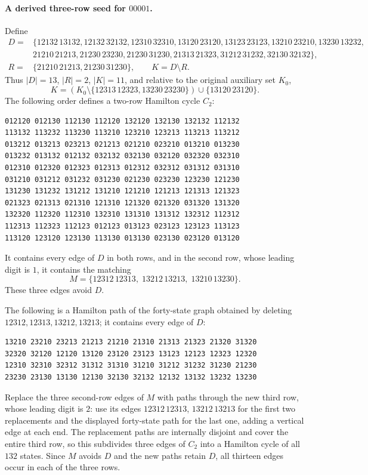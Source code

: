 \paragraph{A derived three-row seed for $00001$.}
Define
\[
\begin{split}
D={}&\{12132\,13132,12132\,32132,12310\,32310,
13120\,23120,13123\,23123,13210\,23210,13230\,13232,\\
&21210\,21213,21230\,23230,21230\,31230,
21313\,21323,31212\,31232,32130\,32132\},\\
R={}&\{21210\,21213,21230\,31230\},\qquad K=D\setminus R.
\end{split}
\]
Thus $|D|=13$, $|R|=2$, $|K|=11$, and relative to the original
auxiliary set $K_0$,
\[
K=(K_0\setminus\{12313\,12323,13230\,23230\})
   \cup\{13120\,23120\}.
\]
The following order defines a two-row Hamilton cycle $C_2$:
\begin{verbatim}
012120 012130 112130 112120 132120 132130 132132 112132
113132 113232 113230 113210 123210 123213 113213 113212
013212 013213 023213 021213 021210 023210 013210 013230
013232 013132 012132 032132 032130 032120 032320 032310
012310 012320 012323 012313 012312 032312 031312 031310
031210 031212 031232 031230 021230 023230 123230 121230
131230 131232 131212 131210 121210 121213 121313 121323
021323 021313 021310 121310 121320 021320 031320 131320
132320 112320 112310 132310 131310 131312 132312 112312
112313 112323 112123 012123 013123 023123 123123 113123
113120 123120 123130 113130 013130 023130 023120 013120
\end{verbatim}
It contains every edge of $D$ in both rows, and in the second row,
whose leading digit is $1$, it contains the matching
\[
M=\{12312\,12313,\;13212\,13213,\;13210\,13230\}.
\]
These three edges avoid $D$.

The following is a Hamilton path of the forty-state graph obtained
by deleting $12312,12313,13212,13213$; it contains every edge of $D$:
\begin{verbatim}
13210 23210 23213 21213 21210 21310 21313 21323 21320 31320
32320 32120 12120 13120 23120 23123 13123 12123 12323 12320
12310 32310 32312 31312 31310 31210 31212 31232 31230 21230
23230 23130 13130 12130 32130 32132 12132 13132 13232 13230
\end{verbatim}
Replace the three second-row edges of $M$ with paths through the
new third row, whose leading digit is $2$: use its edges
$12312\,12313$, $13212\,13213$ for the first two replacements and
the displayed forty-state path for the last one, adding a vertical
edge at each end. The replacement paths are internally disjoint
and cover the entire third row, so this subdivides three edges of
$C_2$ into a Hamilton cycle of all $132$ states. Since $M$ avoids
$D$ and the new paths retain $D$, all thirteen edges occur in
each of the three rows.

